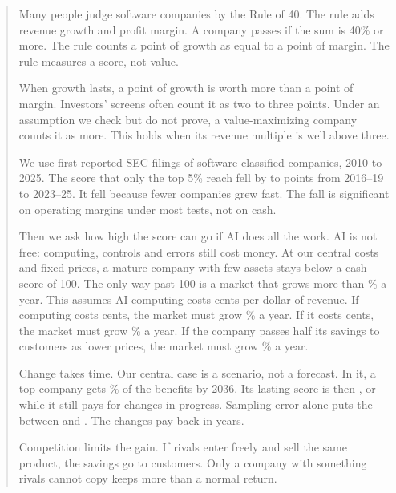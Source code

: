 \begin{abstract}
\noindent Many people judge software companies by the Rule of 40. The rule adds revenue growth and profit margin. A company passes if the sum is 40\% or more. The rule counts a point of growth as equal to a point of margin. The rule measures a score, not value.

When growth lasts, a point of growth is worth more than a point of margin. Investors' screens often count it as two to three points. Under an assumption we check but do not prove, a value-maximizing company counts it as more. This holds when its revenue multiple is well above three.

We use first-reported SEC filings of \VFirmsEone{} software-classified companies, 2010 to 2025. The score that only the top 5\% reach fell by \TopFallOpRound{} to \TopFallCashRound{} points from 2016--19 to 2023--25. It fell because fewer companies grew fast. The fall is significant on operating margins under most tests, not on cash.

Then we ask how high the score can go if AI does all the work. AI is not free: computing, controls and errors still cost money. At our central costs and fixed prices, a mature company with few assets stays below a cash score of 100. The only way past 100 is a market that grows more than \GstarCenOne\% a year. This assumes AI computing costs \CcCen{} cents per dollar of revenue. If computing costs \CcLo{} cents, the market must grow \GstarCcLo\% a year. If it costs \CcHi{} cents, the market must grow \GstarCcHi\% a year. If the company passes half its savings to customers as lower prices, the market must grow \GstarPhiHalf\% a year.

Change takes time. Our central case is a scenario, not a forecast. In it, a top company gets \PaceCenSix\% of the benefits by 2036. Its lasting score is then \CenRSix, or \CenRSixNet{} while it still pays for changes in progress. Sampling error alone puts the \CenRSix{} between \CenRSixLo{} and \CenRSixHi. The changes pay back in \PayBackCen{} years.

Competition limits the gain. If rivals enter freely and sell the same product, the savings go to customers. Only a company with something rivals cannot copy keeps more than a normal return.
\end{abstract}
